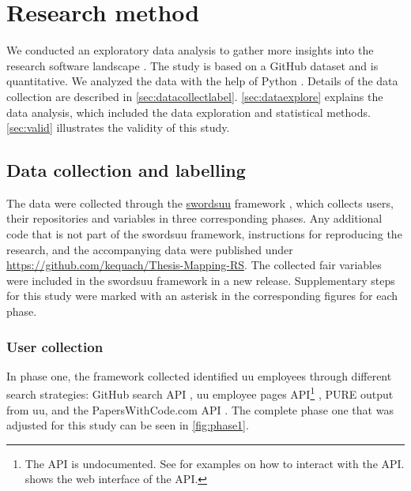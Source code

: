 \chapter{Research method}
\label{chap:method}
We conducted an exploratory data analysis to gather more insights into the research software landscape \cite{tukey_exploratory_1977}. The study is based on a GitHub dataset and is quantitative. We analyzed the data with the help of Python \cite{10.5555/1593511}. 
Details of the data collection are described in \autoref{sec:datacollectlabel}. \autoref{sec:dataexplore} explains the data analysis, which included the data exploration and statistical methods. \autoref{sec:valid} illustrates the validity of this study.

\section{Data collection and labelling}
\label{sec:datacollectlabel}

The data were collected through the \href{https://github.com/UtrechtUniversity/SWORDS-UU}{\acrshort{swordsuu}} framework \cite{de_Bruin_Scan_and_revieW_2021}, which collects users, their repositories and variables in three corresponding phases. Any additional code that is not part of the \acrshort{swordsuu} framework, instructions for reproducing the research, and the accompanying data were published under \linebreak
\href{https://github.com/kequach/Thesis-Mapping-RS}{https://github.com/kequach/Thesis-Mapping-RS}. The collected \acrshort{fair} variables were included in the \acrshort{swordsuu} framework in a new release. Supplementary steps for this study were marked with an asterisk in the corresponding figures for each phase.



\subsection{User collection}

In phase one, the framework collected identified \acrshort{uu} employees through different search strategies: GitHub search API \cite{github_rest}, \acrshort{uu} employee pages API\footnote{The API is undocumented. See \cite{Quach_Mapping-Research-Software-Landscapes-through-Exploratory-Studies-of-GitHub-Data_2022} for examples on how to interact with the API. \cite{uu_employee_pages} shows the web interface of the API.} \cite{uu_employee_pages}, PURE \cite{noauthor_pure_nodate} output from \acrshort{uu}, and the PapersWithCode.com API \cite{noauthor_papers_nodate}. The complete phase one that was adjusted for this study can be seen in \autoref{fig:phase1}. 

